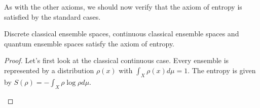 As with the other axioms, we should now verify that the axiom of entropy is satisfied by the standard cases.

\begin{mathSection}
	\begin{prop}
		Discrete classical ensemble spaces, continuous classical ensemble spaces and quantum ensemble spaces satisfy the axiom of entropy.
	\end{prop}
	
	\begin{proof}
		Let's first look at the classical continuous case. Every ensemble is represented by a distribution $\rho(x)$ with $\int_X \rho(x) d\mu=1$. The entropy is given by $S(\rho) = - \int_X \rho \log \rho d\mu$.

		\begin{figure}[H]
			\centering
		\end{figure}
		

\end{proof}
\end{mathSection}
